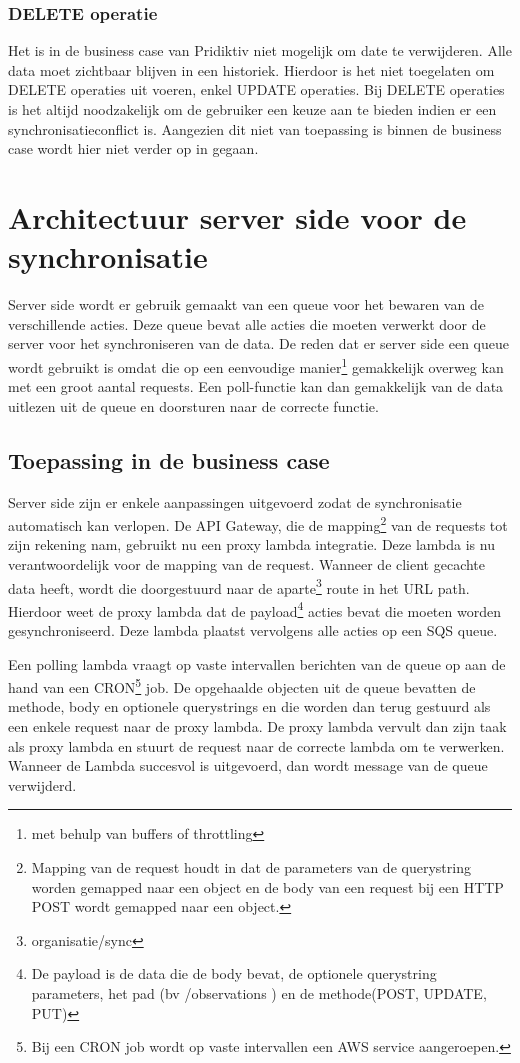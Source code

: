 \subsubsection{DELETE operatie}
Het is in de business case van Pridiktiv niet mogelijk om date te verwijderen. Alle data moet zichtbaar blijven in een historiek. Hierdoor is het niet toegelaten om DELETE operaties uit voeren, enkel UPDATE operaties. Bij DELETE operaties is het altijd noodzakelijk om de gebruiker een keuze aan te bieden indien er een synchronisatieconflict is. Aangezien dit niet van toepassing is binnen de business case wordt hier niet verder op in gegaan.

\section{Architectuur server side voor de synchronisatie}
Server side wordt er gebruik gemaakt van een queue voor het bewaren van de verschillende acties. Deze queue bevat alle acties die moeten verwerkt door de server voor het synchroniseren van de data. De reden dat er server side een queue wordt gebruikt is omdat die op een eenvoudige manier\footnote{met behulp van buffers of throttling} gemakkelijk overweg kan met een groot aantal requests. Een poll-functie kan dan gemakkelijk van de data uitlezen uit de queue en doorsturen naar de correcte functie.
\subsection{Toepassing in de business case}
Server side zijn er enkele aanpassingen uitgevoerd zodat de synchronisatie automatisch kan verlopen. De API Gateway, die de mapping\footnote{Mapping van de request houdt in dat de parameters van de querystring worden gemapped naar een object en de body van een request bij een HTTP POST wordt gemapped naar een object.} van de requests tot zijn rekening nam, gebruikt nu een proxy lambda integratie. Deze lambda is nu verantwoordelijk voor de mapping van de request. Wanneer de client gecachte data heeft, wordt die doorgestuurd naar de aparte\footnote{ organisatie/sync } route in het URL path. Hierdoor weet de proxy lambda dat de payload\footnote{De payload is de data die de body bevat, de optionele querystring parameters, het pad (bv /observations ) en de methode(POST, UPDATE, PUT)} acties bevat die moeten worden gesynchroniseerd. Deze lambda plaatst vervolgens alle acties op een SQS queue. 

Een polling lambda vraagt op vaste intervallen berichten van de queue op aan de hand van een CRON\footnote{Bij een CRON job wordt op vaste intervallen een AWS service aangeroepen.} job. De opgehaalde objecten uit de queue bevatten de methode, body en optionele querystrings en die worden dan terug gestuurd als een enkele request naar de proxy lambda. De proxy lambda vervult dan zijn taak als proxy lambda en stuurt de request naar de correcte lambda om te verwerken. Wanneer de Lambda succesvol is uitgevoerd, dan wordt message van de queue verwijderd.


